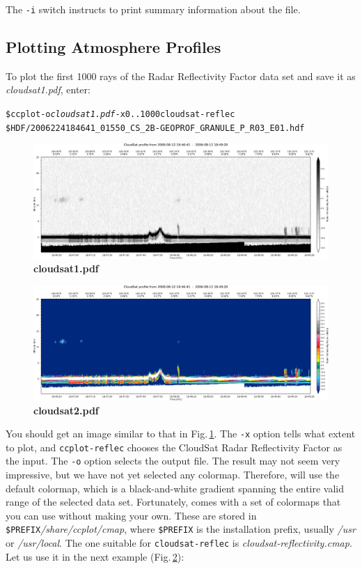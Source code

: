 \noindent The \texttt{-i} switch instructs \ccplot to print summary information
about the file.

\subsection{Plotting Atmosphere Profiles}
To plot the first 1000 rays of the Radar Reflectivity Factor
data set and save it as \textit{cloudsat1.pdf}, enter:

\begin{alltt}
\$ ccplot -o \textit{cloudsat1.pdf} -x 0..1000 cloudsat-reflec
\$HDF/\texttt{2006224184641\_01550\_CS\_2B-GEOPROF\_GRANULE\_P\_R03\_E01.hdf}
\end{alltt}

\begin{figure}[t]
\includegraphics[width=\textwidth]{images/cloudsat1.pdf}
\caption[cloudsat1.pdf]{\textbf{cloudsat1.pdf}}
\label{fig:cloudsat1}
\end{figure}

\begin{figure}[t]
\includegraphics[width=\textwidth]{images/cloudsat2.pdf}
\caption[cloudsat2.pdf]{\textbf{cloudsat2.pdf}}
\label{fig:cloudsat2}
\end{figure}

\noindent You should get an image similar to that in
Fig.\,\ref{fig:cloudsat1}.  The
\texttt{-x} option tells \ccplot what extent to plot, and \texttt{ccplot-reflec}
chooses the CloudSat Radar Reflectivity Factor as the input. The \texttt{-o}
option selects the output file. The result may not seem very impressive, but we
have not yet selected any colormap. Therefore, \ccplot will use the default
colormap, which is a black-and-white gradient spanning the entire valid range of
the selected data set. Fortunately, \ccplot comes with a set of colormaps that
you can use without making your own. These are stored in
\texttt{\$PREFIX}\textit{/share/ccplot/cmap}, where \texttt{\$PREFIX} is the
installation prefix, usually \textit{/usr} or \textit{/usr/local}. The one
suitable for \texttt{cloudsat-reflec} is \textit{cloudsat-reflectivity.cmap}.
Let us use it in the next example (Fig.\,\ref{fig:cloudsat2}):

